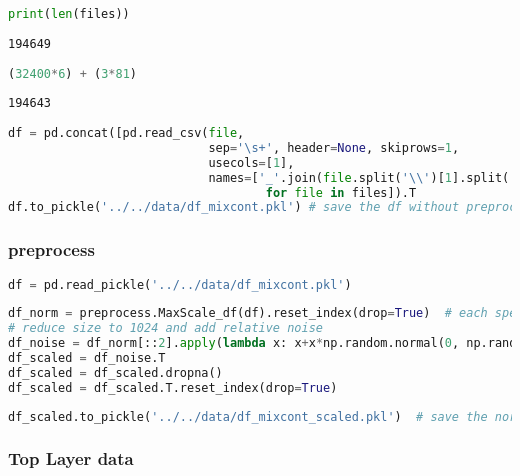 \begin{lstlisting}[language=Python]
print(len(files))
\end{lstlisting}

\begin{lstlisting}
194649
\end{lstlisting}

\begin{lstlisting}[language=Python]
(32400*6) + (3*81)
\end{lstlisting}

\begin{lstlisting}
194643
\end{lstlisting}

\begin{lstlisting}[language=Python]
df = pd.concat([pd.read_csv(file,
                            sep='\s+', header=None, skiprows=1,
                            usecols=[1],
                            names=['_'.join(file.split('\\')[1].split('_')[:-1])]).T 
                                    for file in files]).T
df.to_pickle('../../data/df_mixcont.pkl') # save the df without preprocessing
\end{lstlisting}

\hypertarget{preprocess}{%
\subsubsection*{preprocess}\label{preprocess}}

\begin{lstlisting}[language=Python]
df = pd.read_pickle('../../data/df_mixcont.pkl') 
\end{lstlisting}

\begin{lstlisting}[language=Python]
df_norm = preprocess.MaxScale_df(df).reset_index(drop=True)  # each spectrum is scaled to 1
# reduce size to 1024 and add relative noise
df_noise = df_norm[::2].apply(lambda x: x+x*np.random.normal(0, np.random.randint(1,3)*0.01 , len(x)))
df_scaled = df_noise.T
df_scaled = df_scaled.dropna()
df_scaled = df_scaled.T.reset_index(drop=True)
\end{lstlisting}

\begin{lstlisting}[language=Python]
df_scaled.to_pickle('../../data/df_mixcont_scaled.pkl')  # save the normalized, scaled df
\end{lstlisting}

\hypertarget{top-layer-data}{%
\subsubsection*{Top Layer data}\label{top-layer-data}}


